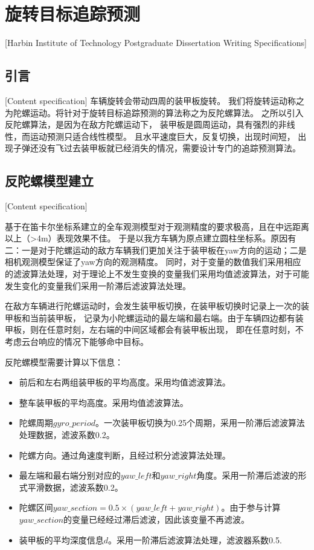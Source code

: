 

\chapter[旋转目标追踪预测]{旋转目标追踪预测}[Harbin Institute of Technology Postgraduate Dissertation Writing Specifications]

\section{引言}[Content specification]
车辆旋转会带动四周的装甲板旋转。
我们将旋转运动称之为陀螺运动。将针对于旋转目标追踪预测的算法称之为反陀螺算法。
之所以引入反陀螺算法，是因为在敌方陀螺运动下，
装甲板是圆周运动，具有强烈的非线性，而运动预测只适合线性模型。
且水平速度巨大，反复切换，出现时间短，
出现子弹还没有飞过去装甲板就已经消失的情况，需要设计专门的追踪预测算法。


\section{反陀螺模型建立}[Content specification]

基于在笛卡尔坐标系建立的全车观测模型对于观测精度的要求极高，且在中远距离以上（>4m）表现效果不佳。
于是以我方车辆为原点建立圆柱坐标系。原因有二：一是对于陀螺运动的敌方车辆我们更加关注于装甲板在yaw方向的运动；二是相机观测模型保证了yaw方向的观测精度。
同时，对于变量的数值我们采用相应的滤波算法处理，对于理论上不发生变换的变量我们采用均值滤波算法，对于可能发生变化的变量我们采用一阶滞后滤波算法处理。
\par

在敌方车辆进行陀螺运动时，会发生装甲板切换，在装甲板切换时记录上一次的装甲板和当前装甲板，
记录为小陀螺运动的最左端和最右端。由于车辆四边都有装甲板，则在任意时刻，左右端的中间区域都会有装甲板出现，
即在任意时刻，不考虑云台响应的情况下能够命中目标。

反陀螺模型需要计算以下信息：
\begin{itemize}[itemindent=2em]
    \item 前后和左右两组装甲板的平均高度。采用均值滤波算法。
    \item 整车装甲板的平均高度。采用均值滤波算法。
    \item 陀螺周期$gyro\_period$。一次装甲板切换为0.25个周期，采用一阶滞后滤波算法处理数据，滤波系数0.2。
    \item 陀螺方向。通过角速度判断，且经过积分滤波算法处理。
    \item 最左端和最右端分别对应的$yaw\_left$和$yaw\_right$角度。采用一阶滞后滤波的形式平滑数据，滤波系数0.2。
    \item 陀螺区间$yaw\_section =0.5 \times (yaw\_left + yaw\_right)$。由于参与计算$yaw\_section$的变量已经经过滞后滤波，因此该变量不再滤波。
    \item 装甲板的平均深度信息$d$。采用一阶滞后滤波算法处理，滤波器系数0.5.
\end{itemize}

